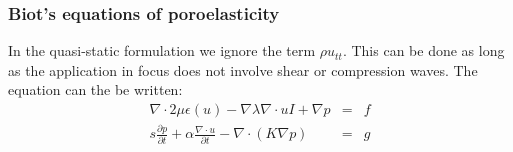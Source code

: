 \begin{frame}
\frametitle{Biot's equations of poroelasticity} 
In the quasi-static formulation we ignore the term 
$\rho u_{tt}$. This can be done as long as the application 
in focus does not involve shear or compression waves.  
\vspace{0.3cm}
The equation can the be written:  
\begin{eqnarray*}
 \nabla\cdot 2 \mu \epsilon(u) - \nabla \lambda \nabla \cdot u I + \nabla p &=& f \\   
s \frac{\partial p}{\partial t} + \alpha \frac{\nabla \cdot u}{\partial t} - \nabla \cdot (K \nabla p) &=& g 
\end{eqnarray*}

\end{frame}
